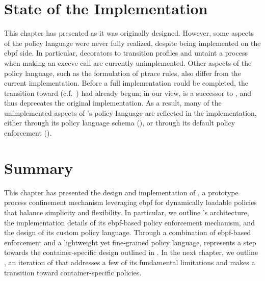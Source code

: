 \section{State of the \bpfbox{} Implementation}
\label{s:bpfbox-discrepancies}

This chapter has presented \bpfbox{} as it was originally designed. However, some aspects
of the \bpfbox{} policy language were never fully realized, despite being implemented on
the \gls{ebpf} side. In particular, decorators to transition profiles and untaint
a process when making an execve call are currently unimplemented. Other aspects of the
policy language, such as the formulation of ptrace rules, also differ from the current
implementation. Before a full implementation could be completed, the transition toward
\bpfcontain{} (c.f.\ ) had already begun; in our view, \bpfcontain{} is
a successor to \bpfbox{}, and thus deprecates the original \bpfbox{} implementation. As
a result, many of the unimplemented aspects of \bpfbox{}'s policy language are reflected
in the \bpfcontain{} implementation, either through its policy language schema
(), or through its default policy enforcement
().



\section{Summary}%
\label{s:bpfbox-summary}

This chapter has presented the design and implementation of \bpfbox{}, a prototype process
confinement mechanism leveraging \gls{ebpf} for dynamically loadable policies that balance
simplicity and flexibility. In particular, we outline \bpfbox{}'s architecture, the
implementation details of its \gls{ebpf}-based policy enforcement mechanism, and the
design of its custom policy language. Through a combination of \gls{ebpf}-based
enforcement and a lightweight yet fine-grained policy language, \bpfbox{} represents
a step towards the container-specific design outlined in .  In the next
chapter, we outline \bpfcontain{}, an iteration of \bpfbox{} that addresses a few of its
fundamental limitations and makes a transition toward container-specific policies.

